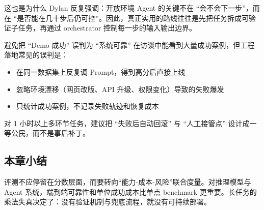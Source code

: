 这也是为什么 Dylan 反复强调：开放环境 Agent 的关键不在 ``会不会下一步''，而在 ``是否能在几十步后仍可控''。因此，真正实用的路线往往是先把任务拆成可验证子任务，再通过 orchestrator 控制每一步的输入输出边界。

\begin{warningbox}{避免把 ``Demo 成功'' 误判为 ``系统可靠''}
在访谈中能看到大量成功案例，但工程落地常见的误判是：
\begin{itemize}
    \item 在同一数据集上反复调 Prompt，得到高分后直接上线
    \item 忽略环境漂移（网页改版、API 升级、权限变化）导致的失败爆发
    \item 只统计成功案例，不记录失败轨迹和恢复成本
\end{itemize}

对 1 小时以上多环节任务，建议把 ``失败后自动回滚'' 与 ``人工接管点'' 设计成一等公民，而不是事后补丁。
\end{warningbox}

\subsection{本章小结}

评测不应停留在分数层面，而要转向``能力-成本-风险''联合度量。对推理模型与 Agent 系统，端到端可靠性和单位成功成本比单点 benchmark 更重要。长任务的乘法失真决定了：没有验证机制与兜底流程，就没有可持续部署。

